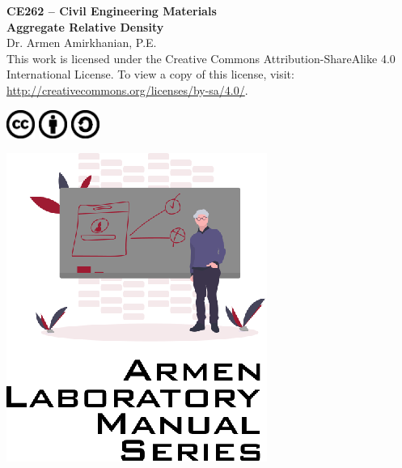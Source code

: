 \documentclass[12pt]{article}
\newcommand{\CourseNum}{CE262}
\newcommand{\CourseName}{Civil Engineering Materials}
\newcommand{\LabTitle}{Aggregate Relative Density}
\begin{document}
\begin{titlepage}
\begin{flushright}
\LARGE{\textbf{\CourseNum{} -- \CourseName}}\\
\vfill
\Huge{\textbf{\LabTitle}}\\
    \vfill
    \large Dr. Armen Amirkhanian, P.E.\\
\vfill
\normalsize This work is licensed under the Creative Commons Attribution-ShareAlike 4.0 International License. To view a copy of this license, visit:
\href{http://creativecommons.org/licenses/by-sa/4.0/}{http://creativecommons.org/licenses/by-sa/4.0/}.

\includegraphics[width=0.07\textwidth]{cc.eps}
\includegraphics[width=0.07\textwidth]{by.eps}
\includegraphics[width=0.07\textwidth]{sa.eps}
\vfill

\includegraphics[width=0.3\linewidth]{Logo.eps}\\ 
 
  
\end{flushright}
\end{titlepage}
\end{document}

